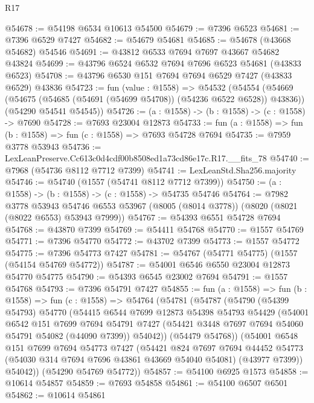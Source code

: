 \begin{lexlean}{R17}
\begin{coremodule}
@54678 := @54198 @6534 @10613 @54500
@54679 := @7396 @6523
@54681 := @7396 @6529 @7427
@54682 := @54679 @54681
@54685 := @54678 (@43668 @54682) @54546
@54691 := @43812 @6533 @7694 @7697 @43667 @54682 @43824
@54699 := @43796 @6524 @6532 @7694 @7696 @6523 @54681 (@43833 @6523)
@54708 := @43796 @6530 @151 @7694 @7694 @6529 @7427 (@43833 @6529) @43836
@54723 := fun (value : @1558) =>
  @54532
    (@54554
      (@54669 (@54675 (@54685 (@54691 (@54699 @54708)) (@54236 @6522 @6528)) @43836))
      (@54290 @54541 @54545))
@54726 := (a : @1558) -> (b : @1558) -> (c : @1558) -> @7690
@54728 := @7693 @23004 @12873
@54733 := fun (a : @1558) => fun (b : @1558) => fun (c : @1558) => @7693 @54728 @7694
@54735 := @7959 @3778 @53943
@54736 := LexLeanPreserve.Cc613c0d4cdf00b8508ed1a73cd86e17c.R17.__fits_78
@54740 := @7968 (@54736 @8112 @7712 @7399)
@54741 := LexLeanStd.Sha256.majority
@54746 := @54740 (@1557 (@54741 @8112 @7712 @7399))
@54750 := (a : @1558) -> (b : @1558) -> (c : @1558) -> @54735 @54746
@54764 := @7982
    @3778
    @53943
    @54746
    @6553
    @53967
    (@8005 (@8014 @3778))
    (@8020 (@8021 (@8022 @6553) @53943 @7999))
@54767 := @54393 @6551 @54728 @7694
@54768 := @43870 @7399
@54769 := @54411 @54768
@54770 := @1557 @54769
@54771 := @7396 @54770
@54772 := @43702 @7399
@54773 := @1557 @54772
@54775 := @7396 @54773 @7427
@54781 := @54767 (@54771 @54775) (@1557 (@54154 @54769 @54772))
@54787 := @54001 @6546 @6550 @23004 @12873 @54770 @54775
@54790 := @54393 @6545 @23002 @7694
@54791 := @1557 @54768
@54793 := @7396 @54791 @7427
@54855 := fun (a : @1558) =>
  fun (b : @1558) =>
  fun (c : @1558) =>
  @54764
    (@54781
      (@54787
        (@54790
          (@54399 @54793)
          @54770
          (@54415
            @6544
            @7699
            @12873
            @54398
            @54793
            @54429
            (@54001
              @6542
              @151
              @7699
              @7694
              @54791
              @7427
              (@54421 @3448 @7697 @7694 @54060 @54791 @54082 (@44090 @7399))
              @54042))
          (@54479 @54768))
        (@54001
          @6548
          @151
          @7699
          @7694
          @54773
          @7427
          (@54421
            @824
            @7697
            @7694
            @44452
            @54773
            (@54030 @314 @7694 @7696 @43861 @43669 @54040 @54081)
            (@43977 @7399))
          @54042))
      (@54290 @54769 @54772))
@54857 := @54100 @6925 @1573
@54858 := @10614 @54857
@54859 := @7693 @54858
@54861 := @54100 @6507 @6501
@54862 := @10614 @54861

\end{coremodule}
\end{lexlean}
